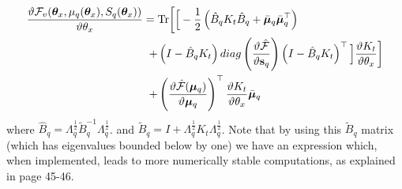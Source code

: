 \begin{align}
\frac{\vartheta \mathcal{F}_v(\boldsymbol \theta_x, \mu_q(\boldsymbol \theta_x), S_q(\boldsymbol \theta_x))}{\vartheta \theta_x}
={}& \text{Tr} \bigg[
\Big[ - \frac{1}{2} \left( \hat{B}_q K_t \hat{B}_q + \bar{\boldsymbol \mu}_q \bar{\boldsymbol \mu}_q^{\top} \right) \nonumber \\
+{}& \left( I - \hat{B}_q K_t \right)
 diag \left(  \frac{\vartheta \hat{\mathcal{F}}}{\vartheta \mathbf{s}_q} \right)
			 \left( I - \hat{B}_q K_t \right)^{\top} \Big]
			  \frac{\vartheta K_t}{\vartheta \theta_x} \bigg] 	\nonumber \\	
+{}&  \left( \frac{\vartheta \hat{\mathcal{F}}( \boldsymbol \mu_q)}{\vartheta \boldsymbol \mu_q} \right)^{\top}
					\frac{\vartheta K_t}{\vartheta \theta_x} \bar{\boldsymbol \mu}_q 
\label{CompleteBoundDerivThetatB}
\end{align}
where $\hat{B}_q = \Lambda_q^{\frac{1}{2}} \widetilde{B}_q^{-1} \Lambda_q^{\frac{1}{2}}$.
and $\tilde{B}_q = I + \Lambda_q^{\frac{1}{2}} K_t \Lambda_q^{\frac{1}{2}}$. Note that by using this
$\tilde{B}_q$ matrix (which has eigenvalues bounded below by one) we have an expression which, when implemented, leads to more numerically stable computations, as explained in \cite{rasmussen-williams} page 45-46. 




